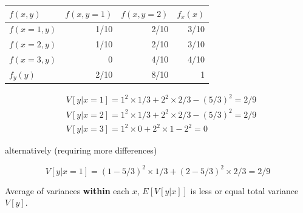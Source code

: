 \documentclass[a4paper,12pt]{article}
\def\emph{\textit}
\begin{document}
{\begin{minipage}[t]{.49\textwidth}
\begin{threeparttable}[htbp]
		\begin{tabular}{lrrr}
\toprule
$f(x,y)$ &$f(x,y=1)$ &$f(x,y=2)$ & $f_x(x)$     \\
\midrule
$f(x=1,y)$ &1/10  &2/10 & 3/10                                                                 \\
$f(x=2,y)$ &1/10  &2/10 & 3/10                                                               \\
$f(x=3,y)$ &0     &4/10 & 4/10                                                       \\
$f_y(y)$   &2/10  &8/10 & 1                                                                \\
\bottomrule
		\end{tabular}
	\end{threeparttable}



$$\begin{aligned}&V[y|x=1]=1^2\times 1/3+2^2\times 2/3-(5/3)^2=2/9\\
&V[y|x=2]=1^2\times 1/3+2^2\times 2/3-(5/3)^2=2/9 \\
&V[y|x=3]=1^2\times 0+2^2\times 1-2^2=0\end{aligned}$$

alternatively (requiring more differences)

$$V[y|x=1]=(1-5/3)^2\times 1/3+(2-5/3)^2\times 2/3=2/9$$

\end{minipage}%


}

Average of variances \textbf{within} each $x$, $E[V[y|x]]$ is less or equal total variance $V[y]$.\\
\end{document}
